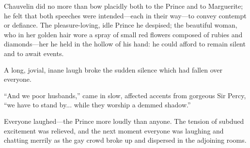 Chauvelin did no more than bow placidly both to the Prince and to Marguerite; he felt that both speeches were intended---each in their way---to convey contempt or defiance. The pleasure-loving, idle Prince he despised; the beautiful woman, who in her golden hair wore a spray of small red flowers composed of rubies and diamonds---her he held in the hollow of his hand: he could afford to remain silent and to await events.

A long, jovial, inane laugh broke the sudden silence which had fallen over everyone.

\enquote{And we poor husbands,} came in slow, affected accents from gorgeous Sir Percy, \enquote{we have to stand by... while they worship a demmed shadow.}

Everyone laughed---the Prince more loudly than anyone. The tension of subdued excitement was relieved, and the next moment everyone was laughing and chatting merrily as the gay crowd broke up and dispersed in the adjoining rooms.